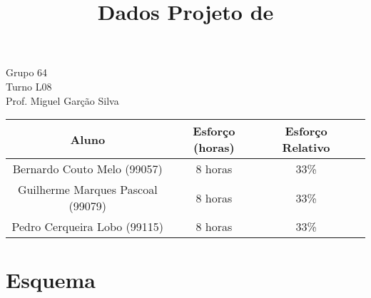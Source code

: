 \documentclass{article}
\title{{\Huge Dados Projeto de}}
\author{}
\date{}
\begin{document}
	\maketitle
	\begin{center}
		{\LARGE Grupo 64}\\
		\vspace{8mm}
		{\LARGE Turno L08}\\
		\vspace{8mm}
		{\LARGE Prof. Miguel Garção Silva}\\

		\vspace{7cm}

		\begin{tabular}{|c|c|c|c|} \hline
			\textbf{Aluno} & \textbf{Esforço (horas)} & \textbf{Esforço Relativo}\\ \hline
			Bernardo Couto Melo (99057)	& 8 horas & 33\%\\ \hline
			Guilherme Marques Pascoal (99079) & 8 horas & 33\%\\ \hline
			Pedro Cerqueira Lobo (99115) & 8 horas & 33\%\\ \hline
		\end{tabular}

	\end{center}

	\pagebreak

	\section*{Esquema}

\end{document}
